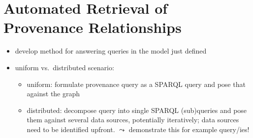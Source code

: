 \chapter{Automated Retrieval of Provenance Relationships}
\label{chap:retrieval}

\begin{itemize}
  \item
    develop method for answering queries in the model just defined
  \item
    uniform vs.\ distributed scenario:
    \begin{itemize}
      \item
        uniform: formulate provenance query as a SPARQL query and pose that against the graph
      \item
        distributed: decompose query into single SPARQL (sub)queries and pose them against several data sources,
        potentially iteratively;
        data sources need to be identified upfront.
        $\leadsto$ demonstrate this for example query/ies!
        
    \end{itemize}
\end{itemize}



